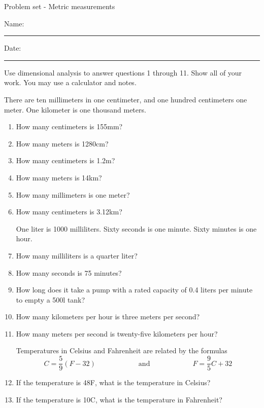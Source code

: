 \documentclass[12pt]{article}
\begin{document}
\pagestyle{empty} %
\begin{center}
          Problem set - Metric measurements \\[0.5in]
\end{center}
Name: \rule{4in}{0.005in} Date: \rule{1.5in}{0.005in} 
  \vspace{0.25in}

Use dimensional analysis to answer questions 1 through 11. Show all of your work. You may use a calculator and notes. 

There are ten millimeters in one centimeter, and one hundred centimeters one meter. One kilometer is one thousand meters. 

\newcommand{\spacing}{\vspace{0.75in}}
\begin{enumerate}
\item How many centimeters is 155mm?  
\spacing

\item How many meters is 1280cm? 
\spacing

\item How many centimeters is 1.2m? 
\spacing

\item How many meters is 14km?  
\spacing

\item How many millimeters is one meter? 
\spacing

\item How many centimeters is 3.12km? 
\spacing

One liter is 1000 milliliters. Sixty seconds is one minute. Sixty minutes is one hour. 

\item How many milliliters is a quarter liter? 
\spacing

\item How many seconds is 75 minutes? 
\spacing

\item How long does it take a pump with a rated capacity of 0.4 liters per minute to empty a 500l tank? 
\spacing

\item How many kilometers per hour is three meters per second? 
\spacing

\item How many meters per second is twenty-five kilometers per hour? 
\spacing

Temperatures in Celsius and Fahrenheit are related by the formulas 
		\begin{equation*}
			C=\dfrac{5}{9}(F-32) \hspace{1in} \text{and} \hspace{1in} F=\dfrac{9}{5}C+32 
		\end{equation*}
\spacing

\item If the temperature is 48\degree F, what is the temperature in Celsius? 
\spacing

\item If the temperature is 10\degree C, what is the temperature in Fahrenheit? 
\spacing

\end{enumerate}
\end{document}

